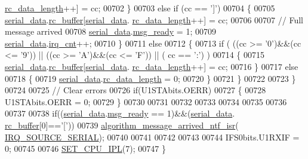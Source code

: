 \begin{DoxyCode}
      \hyperlink{a00030_ab136d4fef2c523afd55b6ca74c46d7cc}{rc\_data\_length}++] = cc;
00702         \}
00703         \textcolor{keywordflow}{else} \textcolor{keywordflow}{if} (cc == \textcolor{charliteral}{']'})
00704         \{
00705             \hyperlink{a00030_a77d3b77ccd59a0065642bf1ac7887b9d}{serial\_data}.\hyperlink{a00030_ac734cb8be27f86bd99edc539434883a4}{rc\_buffer}[\hyperlink{a00030_a77d3b77ccd59a0065642bf1ac7887b9d}{serial\_data}.
      \hyperlink{a00030_ab136d4fef2c523afd55b6ca74c46d7cc}{rc\_data\_length}++] = cc;
00706 
00707             \textcolor{comment}{// Full message arrived}
00708             \hyperlink{a00030_a77d3b77ccd59a0065642bf1ac7887b9d}{serial\_data}.\hyperlink{a00030_ac0789a6c9ab7ccd13d6f04ae31496854}{msg\_ready} = 1;
00709             \hyperlink{a00030_a77d3b77ccd59a0065642bf1ac7887b9d}{serial\_data}.\hyperlink{a00030_a15d632931355763426453b626cab774b}{irq\_cnt}++;
00710         \}
00711         \textcolor{keywordflow}{else}
00712         \{        
00713             \textcolor{keywordflow}{if} ( ((cc >= \textcolor{charliteral}{'0'})&&(cc <= \textcolor{charliteral}{'9'})) || ((cc >= \textcolor{charliteral}{'A'})&&(cc <= \textcolor{charliteral}{'F'})) || ( cc == \textcolor{charliteral}{':'}) )
00714             \{
00715                 \hyperlink{a00030_a77d3b77ccd59a0065642bf1ac7887b9d}{serial\_data}.\hyperlink{a00030_ac734cb8be27f86bd99edc539434883a4}{rc\_buffer}[\hyperlink{a00030_a77d3b77ccd59a0065642bf1ac7887b9d}{serial\_data}.
      \hyperlink{a00030_ab136d4fef2c523afd55b6ca74c46d7cc}{rc\_data\_length}++] = cc;
00716             \}
00717             \textcolor{keywordflow}{else}
00718             \{
00719                 \hyperlink{a00030_a77d3b77ccd59a0065642bf1ac7887b9d}{serial\_data}.\hyperlink{a00030_ab136d4fef2c523afd55b6ca74c46d7cc}{rc\_data\_length} = 0;
00720             \}                          
00721         \}
00722     
00723     \}
00724     
00725     \textcolor{comment}{// Clear errors}
00726     \textcolor{keywordflow}{if}(U1STAbits.OERR)
00727     \{
00728         U1STAbits.OERR = 0;
00729     \}
00730          
00731 
00732 
00733 
00734 
00735 
00736 
00737 
00738     \textcolor{keywordflow}{if}((\hyperlink{a00030_a77d3b77ccd59a0065642bf1ac7887b9d}{serial\_data}.\hyperlink{a00030_ac0789a6c9ab7ccd13d6f04ae31496854}{msg\_ready} == 1)&&(\hyperlink{a00030_a77d3b77ccd59a0065642bf1ac7887b9d}{serial\_data}.
      \hyperlink{a00030_ac734cb8be27f86bd99edc539434883a4}{rc\_buffer}[0]==\textcolor{charliteral}{'['}))
00739          \hyperlink{a00021_a85471d58eae93d5d7e7e2b52e2b915d3}{algorithm\_message\_arrived\_ntf\_isr}(
      \hyperlink{a00021_a286de80383de54438b3e38d9f149dfd0}{IRQ\_SOURCE\_SERIAL});
00740            
00741   
00742  
00743     
00744     IFS0bits.U1RXIF = 0;  
00745 
00746     \hyperlink{a00015_a34d4c80d85281a545f3c7f1530803d65}{SET\_CPU\_IPL}(7);
00747 \}
\end{DoxyCode}



